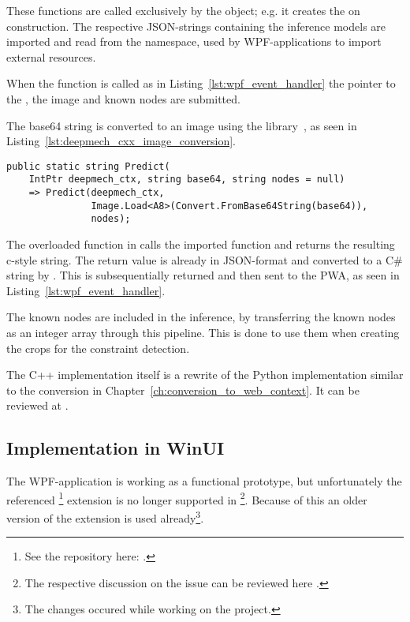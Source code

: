 These functions are called exclusively by the  object; e.g. it creates the  on construction.
The respective JSON-strings containing the inference models are imported and read from the  namespace, used by WPF-applications to import external resources.

When the  function is called as in Listing~\ref{lst:wpf_event_handler} the pointer to the , the image and known nodes are submitted.

The base64 string is converted to an image using the  library~\cite{SixLabors2021}, as seen in Listing~\ref{lst:deepmech_cxx_image_conversion}.

\begin{lstlisting}[label={lst:deepmech_cxx_image_conversion}, caption={Deepmech\_cxx overload for image conversion.}]
public static string Predict(
    IntPtr deepmech_ctx, string base64, string nodes = null)
    => Predict(deepmech_ctx,
               Image.Load<A8>(Convert.FromBase64String(base64)),
               nodes);
\end{lstlisting}

The overloaded  function in  calls the imported  function and returns the resulting c-style string.
The return value is already in JSON-format and converted to a C\# string by .
This is subsequentially returned and then sent to the PWA, as seen in Listing~\ref{lst:wpf_event_handler}.

The known nodes are included in the inference, by transferring the known nodes as an integer array through this pipeline.
This is done to use them when creating the crops for the constraint detection.

The C++ implementation itself is a rewrite of the Python implementation similar to the conversion in Chapter~\ref{ch:conversion_to_web_context}.
It can be reviewed at .

\subsection{Implementation in WinUI}

The WPF-application is working as a functional prototype, but unfortunately the referenced \footnote{See the repository here: .} extension is no longer supported in \footnote{The respective discussion on the issue can be reviewed here .}.
Because of this an older version of the extension is used already\footnote{The changes occured while working on the project.}.

